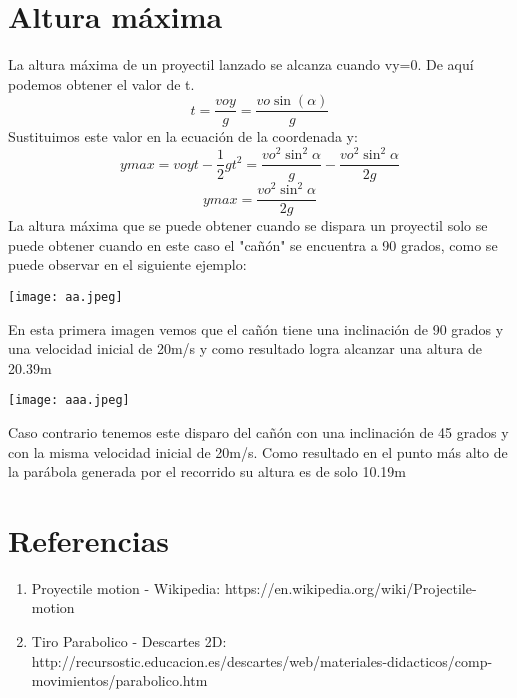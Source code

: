 \documentclass{article}
\begin{document}
\section{Altura máxima}
La altura máxima de un proyectil lanzado se alcanza cuando vy=0. De aquí podemos obtener el valor de t.
\begin{equation}
    t=\frac{voy}{g}=\frac{vo\sin (\alpha)}{g}
\end{equation}
Sustituimos este valor en la ecuación de la coordenada y:
\begin{equation}
    ymax=voyt-\frac{1}{2}gt^2=\frac{vo^2\sin ^2 \alpha}{g}-\frac{vo^2 \sin ^2 \alpha}{2g}
\end{equation}
\begin{equation}
    ymax=\frac{vo^2\sin ^2 \alpha}{2g}
\end{equation}
La altura máxima que se puede obtener cuando se dispara un proyectil solo se puede obtener cuando en este caso el "cañón" se encuentra a 90 grados, como se puede observar en el siguiente ejemplo:
\begin{wrapfigure}
\texttt{[image: aa.jpeg]}
\end{wrapfigure}
En esta primera imagen vemos que el cañón tiene una inclinación de 90 grados y una velocidad inicial de 20m/s y como resultado logra alcanzar una altura de 20.39m
\begin{wrapfigure}
\texttt{[image: aaa.jpeg]}
\end{wrapfigure}
Caso contrario tenemos este disparo del cañón con una inclinación de 45 grados y con la misma velocidad inicial de 20m/s. Como resultado en el punto más alto de la parábola generada por el recorrido su altura es de solo 10.19m

\section{Referencias}
\begin{enumerate}
    \item Proyectile motion - Wikipedia: https://en.wikipedia.org/wiki/Projectile-motion
    \item Tiro Parabolico - Descartes 2D: http://recursostic.educacion.es/descartes/web/materiales-didacticos/comp-movimientos/parabolico.htm
    
\end{enumerate}
\end{document}
